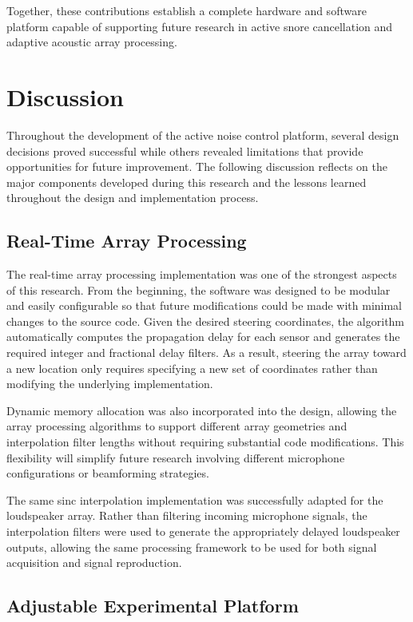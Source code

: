 Together, these contributions establish a complete hardware and software platform capable of supporting future research in active snore cancellation and adaptive acoustic array processing.

\section{Discussion}

Throughout the development of the active noise control platform, several design decisions proved successful while others revealed limitations that provide opportunities for future improvement. The following discussion reflects on the major components developed during this research and the lessons learned throughout the design and implementation process.

\subsection{Real-Time Array Processing}

The real-time array processing implementation was one of the strongest aspects of this research. From the beginning, the software was designed to be modular and easily configurable so that future modifications could be made with minimal changes to the source code. Given the desired steering coordinates, the algorithm automatically computes the propagation delay for each sensor and generates the required integer and fractional delay filters. As a result, steering the array toward a new location only requires specifying a new set of coordinates rather than modifying the underlying implementation.

Dynamic memory allocation was also incorporated into the design, allowing the array processing algorithms to support different array geometries and interpolation filter lengths without requiring substantial code modifications. This flexibility will simplify future research involving different microphone configurations or beamforming strategies.

The same sinc interpolation implementation was successfully adapted for the loudspeaker array. Rather than filtering incoming microphone signals, the interpolation filters were used to generate the appropriately delayed loudspeaker outputs, allowing the same processing framework to be used for both signal acquisition and signal reproduction.

\subsection{Adjustable Experimental Platform}


